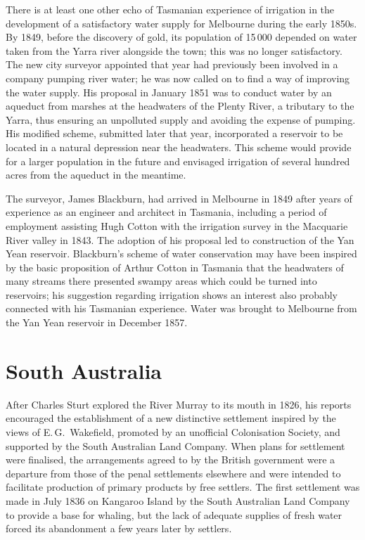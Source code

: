 There is at least one other echo of Tasmanian experience of irrigation
in the development of a satisfactory water supply for Melbourne during
the early 1850s.  By 1849, before the discovery of gold, its
population of 15\,000 depended on water taken from the Yarra river
 alongside the town; this was no longer
satisfactory.  The new city surveyor appointed that year had
previously been involved in a company pumping river water; he was now
called on to find a way of improving the water supply.  His proposal
in January 1851 was to conduct water by an aqueduct
 from marshes at the headwaters of the
Plenty River,  a tributary to the Yarra, thus
ensuring an unpolluted supply and avoiding the expense of pumping.
His modified scheme, submitted later that year, incorporated a
reservoir to be located in a natural
depression near the headwaters.  This scheme would provide for a
larger population in the future and envisaged irrigation of several
hundred acres from the aqueduct in the
meantime.

The surveyor, James Blackburn,  had arrived in
Melbourne in 1849 after years of experience as an engineer and
architect in Tasmania, including a period of employment assisting Hugh
Cotton  with the irrigation survey in the Macquarie
River valley in 1843.  The adoption of his proposal led to
construction of the Yan Yean reservoir.
 Blackburn's scheme of water conservation
may have been inspired by the basic proposition of Arthur Cotton in
Tasmania that the headwaters of many streams there presented swampy
areas which could be turned into reservoirs; his suggestion regarding
irrigation shows an interest also probably connected with his
Tasmanian experience.  Water was brought to Melbourne from the Yan
Yean reservoir in December 1857.

\section*{South Australia} 

After Charles Sturt   explored the River Murray
 to its mouth in 1826, his reports encouraged the
establishment of a new distinctive settlement inspired by the views of
E.\,G.~Wakefield,
 promoted by an
unofficial Colonisation Society, and supported by the South Australian
Land Company.  When plans for
settlement were finalised, the arrangements agreed to by the British
government were a departure from those of the penal settlements
elsewhere and were intended to facilitate production of primary
products by free settlers.  The first settlement was made in July 1836
on Kangaroo Island  by the South Australian
Land Company to provide a base for whaling, but the lack of adequate
supplies of fresh water forced its abandonment a few years later by
settlers.

